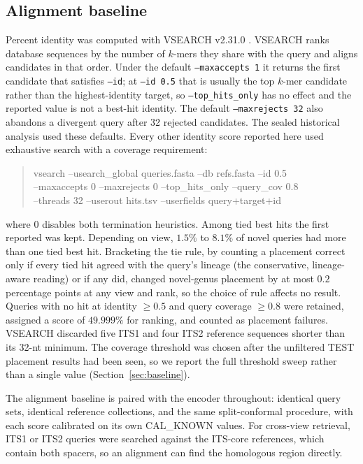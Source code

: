 \documentclass[11pt]{article}
\begin{document}
\subsection{Alignment baseline}
\label{sec:alignment}
Percent identity was computed with VSEARCH v2.31.0 \cite{rognes2016vsearch}.
VSEARCH ranks database sequences by the number of $k$-mers they share with the
query and aligns candidates in that order. Under the default
\texttt{--maxaccepts 1} it returns the first candidate that satisfies
\texttt{--id}; at \texttt{--id 0.5} that is usually the top $k$-mer candidate
rather than the highest-identity target, so \texttt{--top\_hits\_only} has no
effect and the reported value is not a best-hit identity. The default
\texttt{--maxrejects 32} also abandons a divergent query after 32 rejected
candidates. The sealed historical analysis used these defaults. Every other
identity score reported here used exhaustive search with a coverage
requirement:
\begin{quote}\small\ttfamily
vsearch --usearch\_global queries.fasta --db refs.fasta --id 0.5\\
--maxaccepts 0 --maxrejects 0 --top\_hits\_only --query\_cov 0.8\\
--threads 32 --userout hits.tsv --userfields query+target+id
\end{quote}
where 0 disables both termination heuristics. Among tied best hits the first
reported was kept. Depending on view, $1.5\%$ to $8.1\%$ of novel queries had
more than one tied best hit. Bracketing the tie rule, by counting a placement
correct only if every tied hit agreed with the query's lineage (the conservative,
lineage-aware reading) or if any did, changed novel-genus placement by at most
$0.2$ percentage points at any view and rank, so the choice of rule affects no
result. Queries with no
hit at identity $\geq0.5$ and query coverage $\geq0.8$ were retained, assigned a
score of $49.999\%$ for ranking, and counted as placement failures. VSEARCH
discarded five ITS1 and four ITS2 reference sequences shorter than its 32-nt
minimum. The coverage threshold was chosen after the unfiltered TEST placement
results had been seen, so we report the full threshold sweep rather than a
single value (Section~\ref{sec:baseline}).

The alignment baseline is paired with the encoder throughout: identical query
sets, identical reference collections, and the same split-conformal procedure,
with each score calibrated on its own CAL\_KNOWN values. For cross-view
retrieval, ITS1 or ITS2 queries were searched against the ITS-core references,
which contain both spacers, so an alignment can find the homologous region
directly.
\end{document}
